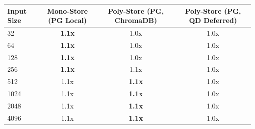 \begin{tabular}{lccc}
\toprule
\textbf{Input Size} & \textbf{Mono-Store (PG Local)} & \textbf{Poly-Store (PG, ChromaDB)} & \textbf{Poly-Store (PG, QD Deferred)} \\
\midrule
32 & \textbf{1.1x} & 1.0x & 1.0x \\
64 & \textbf{1.1x} & 1.0x & 1.0x \\
128 & \textbf{1.1x} & 1.0x & 1.0x \\
256 & \textbf{1.1x} & 1.1x & 1.0x \\
512 & 1.1x & \textbf{1.1x} & 1.0x \\
1024 & 1.1x & \textbf{1.1x} & 1.0x \\
2048 & 1.1x & \textbf{1.1x} & 1.0x \\
4096 & 1.1x & \textbf{1.1x} & 1.0x \\
\bottomrule
\end{tabular}
